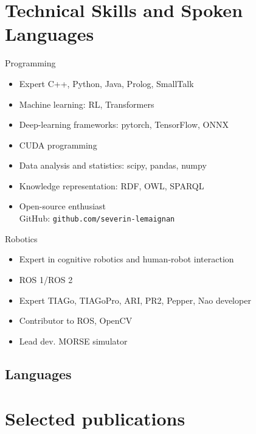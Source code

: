 \documentclass[10pt,a4paper]{moderncv}        %
\begin{document}
\section{Technical Skills and Spoken Languages}

\cvcomputer
    {Programming}{
        \begin{itemize}
        \item Expert C++, Python, Java, Prolog, SmallTalk
        \item Machine learning: RL, Transformers
        \item Deep-learning frameworks: pytorch, TensorFlow, ONNX
        \item CUDA programming
        \item Data analysis and statistics: scipy, pandas, numpy
        \item Knowledge representation: RDF, OWL, SPARQL
        \item Open-source enthusiast\\ GitHub: \texttt{github.com/severin-lemaignan}
        \end{itemize}
        }
    {Robotics}{
        \begin{itemize}
            \item Expert in cognitive robotics and human-robot interaction
            \item ROS 1/ROS 2
            \item Expert TIAGo, TIAGoPro, ARI, PR2, Pepper, Nao developer
            \item Contributor to ROS, OpenCV
            \item Lead dev. MORSE simulator
        \end{itemize}
        }

\subsection{Languages}


\section{Selected publications}
\end{document}

